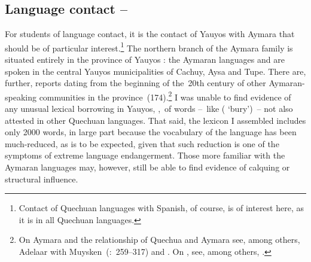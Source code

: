 \subsection{Language contact -- }
For students of language contact, it is the contact of Yauyos with Aymara that should be of particular interest.\footnote{Contact of Quechuan languages with Spanish, of course, is of interest here, as it is in all Quechuan languages.} The northern branch of the Aymara family is situated entirely in the province of Yauyos \citep[173]{Adelaar04}: the Aymaran languages  and  are spoken in the central Yauyos municipalities of Cachuy, Aysa and Tupe. There are, further, reports dating from the beginning of the~20th century of other Aymaran-speaking communities in the province~(174).\footnote{On Aymara and the relationship of Quechua and Aymara see, among others, Adelaar with Muysken~(\citeyear{Adelaar04}:~259--317) and \citet{CerroP94,CerroP00}. On , see, among others, \citet{Hardman66,Hardman83,Hardman00}.} I was unable to find evidence of any unusual lexical borrowing in Yauyos, \ie,~of words --~like ( ‘bury’)~-- not also attested in other Quechuan languages. That said, the lexicon I assembled includes only 2000 words, in large part because the vocabulary of the language has been much-reduced, as is to be expected, given that such reduction is one of the symptoms of extreme language endangerment. Those more familiar with the Aymaran languages may, however, still be able to find evidence of calquing or structural influence.


